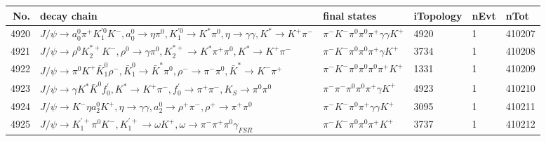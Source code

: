 \begin{table}[htbp] 
\begin{center}
\begin{small}
\begin{tabular}{rlllll}\hline\hline
 No. & decay chain & final states &  iTopology & nEvt & nTot \\\hline
4920&$J/\psi       \rightarrow a_{0}^{0}      \pi^{+}        K_1^{'0}      K^{-}          , a_{0}^{0}       \rightarrow \eta          \pi^{0}        , K_1^{'0}       \rightarrow K^{*}          \pi^{0}        , \eta           \rightarrow \gamma       \gamma       , K^{*}           \rightarrow K^{+}          \pi^{-}        $&$\pi^{-}        K^{-}          \pi^{0}        \pi^{0}        \pi^{+}        \gamma       \gamma       K^{+}          $& 4920&    1&410207\\
4921&$J/\psi       \rightarrow \rho^{0}      K_2^{*+}       K^{-}          , \rho^{0}       \rightarrow \gamma       \pi^{0}        , K_2^{*+}        \rightarrow K^{*}          \pi^{+}        \pi^{0}        , K^{*}           \rightarrow K^{+}          \pi^{-}        $&$\pi^{-}        K^{-}          \pi^{0}        \pi^{0}        \pi^{+}        \gamma       K^{+}          $& 3734&    1&410208\\
4922&$J/\psi       \rightarrow \pi^{0}        K^{+}          \bar{K}_1^{0} \rho^{-}      , \bar{K}_1^{0}  \rightarrow \bar{K}^{*}   \pi^{0}        , \rho^{-}       \rightarrow \pi^{-}        \pi^{0}        , \bar{K}^{*}    \rightarrow K^{-}          \pi^{+}        $&$\pi^{-}        K^{-}          \pi^{0}        \pi^{0}        \pi^{0}        \pi^{+}        K^{+}          $& 1331&    1&410209\\
4923&$J/\psi       \rightarrow \gamma       K^{*}          \bar{K}^{0}   f^{'}_{0}     , K^{*}           \rightarrow K^{+}          \pi^{-}        , f^{'}_{0}      \rightarrow \pi^{+}        \pi^{-}        , K_{S}           \rightarrow \pi^{0}        \pi^{0}        $&$\pi^{-}        \pi^{-}        \pi^{0}        \pi^{0}        \pi^{+}        \gamma       K^{+}          $& 4923&    1&410210\\
4924&$J/\psi       \rightarrow K^{-}          \eta          a_{2}^{0}      K^{+}          , \eta           \rightarrow \gamma       \gamma       , a_{2}^{0}       \rightarrow \rho^{+}      \pi^{-}        , \rho^{+}       \rightarrow \pi^{+}        \pi^{0}        $&$\pi^{-}        K^{-}          \pi^{0}        \pi^{+}        \gamma       \gamma       K^{+}          $& 3095&    1&410211\\
4925&$J/\psi       \rightarrow K_1^{'+}      \pi^{0}        K^{-}          , K_1^{'+}       \rightarrow \omega         K^{+}          , \omega          \rightarrow \pi^{-}        \pi^{+}        \pi^{0}        \gamma_{FSR} $&$\pi^{-}        K^{-}          \pi^{0}        \pi^{0}        \pi^{+}        K^{+}          $& 3737&    1&410212\\

\end{tabular}
\end{small}
\end{center}
\end{table}
